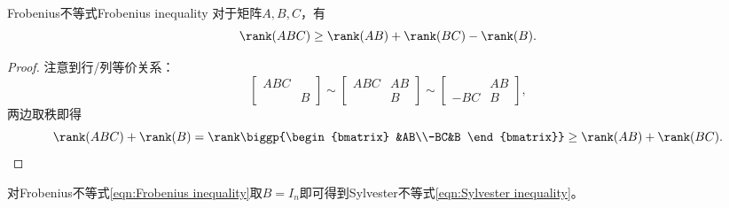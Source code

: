 \begin{theorem}{Frobenius不等式}{Frobenius inequality}
	对于矩阵$A,B,C$，有
	\begin{equation}
		\label{eqn:Frobenius inequality}
		\rank(ABC)\geq\rank(AB)+\rank(BC)-\rank(B).
	\end{equation}
\end{theorem}
\begin{proof}
	注意到行/列等价关系：
	\[
		\begin{bmatrix}
			ABC\\ &B
		\end{bmatrix}\sim\begin{bmatrix}
			ABC&AB\\ &B
		\end{bmatrix}\sim\begin{bmatrix}
			&AB\\-BC&B
		\end{bmatrix},
	\]
	两边取秩即得
	\[
		\rank(ABC)+\rank(B)=\rank\biggp{\begin{bmatrix}
			&AB\\-BC&B
		\end{bmatrix}}\geq\rank(AB)+\rank(BC).
		\qedhere
	\]
\end{proof}

\begin{corollary}
	对Frobenius不等式\eqref{eqn:Frobenius inequality}取$B=I_n$即可得到Sylvester不等式\eqref{eqn:Sylvester inequality}。
\end{corollary}

